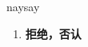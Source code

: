 
\begin{frame}
{\huge naysay}
\begin{center}
\begin{enumerate}\Large
  \item \textbf{拒绝，否认}
\end{enumerate}
\end{center}
\end{frame}
